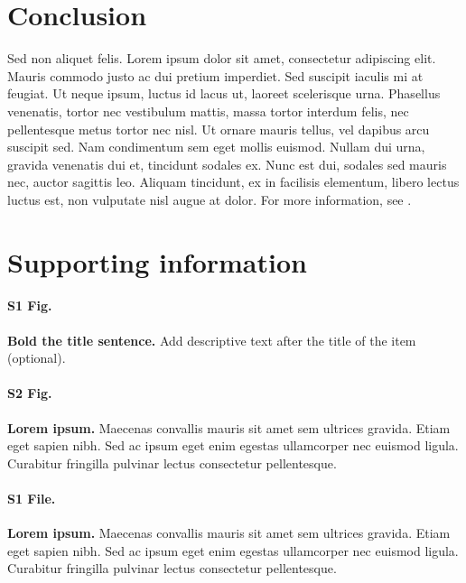\documentclass[10pt,letterpaper]{article}
\begin{document}
\section*{Conclusion}


Sed non aliquet felis. Lorem ipsum dolor sit amet, consectetur adipiscing elit. Mauris commodo justo ac dui pretium imperdiet. Sed suscipit iaculis mi at feugiat. Ut neque ipsum, luctus id lacus ut, laoreet scelerisque urna. Phasellus venenatis, tortor nec vestibulum mattis, massa tortor interdum felis, nec pellentesque metus tortor nec nisl. Ut ornare mauris tellus, vel dapibus arcu suscipit sed. Nam condimentum sem eget mollis euismod. Nullam dui urna, gravida venenatis dui et, tincidunt sodales ex. Nunc est dui, sodales sed mauris nec, auctor sagittis leo. Aliquam tincidunt, ex in facilisis elementum, libero lectus luctus est, non vulputate nisl augue at dolor. For more information, see .

\section*{Supporting information}

\paragraph*{S1 Fig.}
\label{S1_Fig}
{\bf Bold the title sentence.} Add descriptive text after the title of the item (optional).

\paragraph*{S2 Fig.}
\label{S2_Fig}
{\bf Lorem ipsum.} Maecenas convallis mauris sit amet sem ultrices gravida. Etiam eget sapien nibh. Sed ac ipsum eget enim egestas ullamcorper nec euismod ligula. Curabitur fringilla pulvinar lectus consectetur pellentesque.

\paragraph*{S1 File.}
\label{S1_File}
{\bf Lorem ipsum.}  Maecenas convallis mauris sit amet sem ultrices gravida. Etiam eget sapien nibh. Sed ac ipsum eget enim egestas ullamcorper nec euismod ligula. Curabitur fringilla pulvinar lectus consectetur pellentesque.
\end{document}
